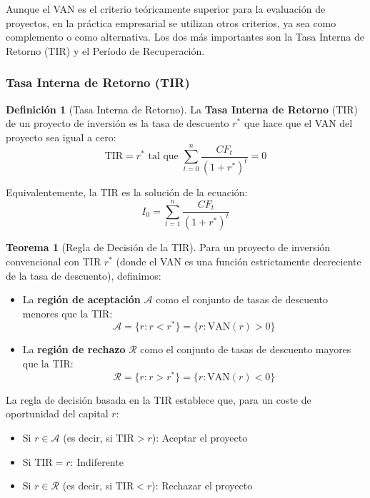 \documentclass[12pt,a4paper]{article}
\theoremstyle{definition}
\newtheorem{definicion}{Definición}[section]
\newtheorem{teorema}{Teorema}[section]
\begin{document}
Aunque el VAN es el criterio teóricamente superior para la evaluación de proyectos, en la práctica empresarial se utilizan otros criterios, ya sea como complemento o como alternativa. Los dos más importantes son la Tasa Interna de Retorno (TIR) y el Período de Recuperación.

\subsubsection{Tasa Interna de Retorno (TIR)}

\begin{definicion}[Tasa Interna de Retorno]
La \textbf{Tasa Interna de Retorno} (TIR) de un proyecto de inversión es la tasa de descuento $r^*$ que hace que el VAN del proyecto sea igual a cero:
\begin{equation}
\text{TIR} = r^* \text{ tal que } \sum_{t=0}^{n} \frac{CF_t}{(1+r^*)^t} = 0
\end{equation}
\end{definicion}

Equivalentemente, la TIR es la solución de la ecuación:
\begin{equation}
I_0 = \sum_{t=1}^{n} \frac{CF_t}{(1+r^*)^t}
\end{equation}

\begin{center}
    
\end{center}

\begin{teorema}[Regla de Decisión de la TIR]
Para un proyecto de inversión convencional con TIR $r^*$ (donde el VAN es una función estrictamente decreciente de la tasa de descuento), definimos:
\begin{itemize}
\item La \textbf{región de aceptación} $\mathcal{A}$ como el conjunto de tasas de descuento menores que la TIR:
$$\mathcal{A} = \{r : r < r^*\} = \{r : \text{VAN}(r) > 0\}$$
\item La \textbf{región de rechazo} $\mathcal{R}$ como el conjunto de tasas de descuento mayores que la TIR:
$$\mathcal{R} = \{r : r > r^*\} = \{r : \text{VAN}(r) < 0\}$$
\end{itemize}

La regla de decisión basada en la TIR establece que, para un coste de oportunidad del capital $r$:
\begin{itemize}
\item Si $r \in \mathcal{A}$ (es decir, si $\text{TIR} > r$): Aceptar el proyecto
\item Si $\text{TIR} = r$: Indiferente
\item Si $r \in \mathcal{R}$ (es decir, si $\text{TIR} < r$): Rechazar el proyecto
\end{itemize}
\end{teorema}
\end{document}
